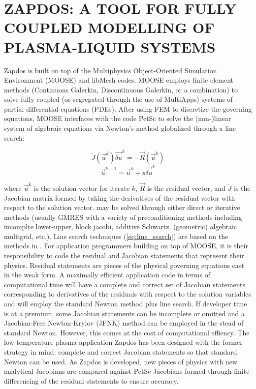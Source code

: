 \chapter{ZAPDOS: A TOOL FOR FULLY COUPLED MODELLING OF PLASMA-LIQUID SYSTEMS}

Zapdos is built on top of the Multiphysics Object-Oriented Simulation Environment (MOOSE) \cite{mooseSite} and libMesh \cite{libmeshSite} codes. MOOSE employs finite element methods (Continuous Galerkin, Discontinuous Galerkin, or a combination) to solve fully coupled (or segregated through the use of MultiApps) systems of partial differential equations (PDEs). After using FEM to discretize the governing equations, MOOSE interfaces with the code PetSc \cite{petscSite} to solve the (non-)linear system of algebraic equations via Newton's method globalized through a line search:

\begin{equation}
  \tilde{J}(\vec{u}^k)\vec{\delta u}^k = -\vec{R}(\vec{u}^k)
  \label{eq:Newton}
\end{equation}
\begin{equation}
  \vec{u}^{k+1} = \vec{u}^k + s\vec{\delta u}^k
  \label{eq:line_search}
\end{equation}

where $\vec{u}^k$ is the solution vector for iterate $k$, $\vec{R}$ is the residual vector, and $\tilde{J}$ is the Jacobian matrix formed by taking the derivatives of the residual vector with respect to the solution vector.\cite{knoll2004jacobian}  may be solved through either direct or iterative methods (usually GMRES with a variety of preconditioning methods including incomplte lower-upper, block jacobi, additive Schwartz, (geometric) algebraic multigrid, etc.). Line search techniques (\cref{eq:line_search}) are based on the methods in \cite{dennis1996numerical}. For application programmers building on top of MOOSE, it is their responsibility to code the residual and Jacobian statements that represent their physics. Residual statements are pieces of the physical governing equations cast in the weak form. A maximally efficient application code in terms of computational time will have a complete and correct set of Jacobian statements corresponding to derivatives of the residuals with respect to the solution variables and will employ the standard Newton method plus line search. If developer time is at a premium, some Jacobian statements can be incomplete or omitted and a Jacobian-Free Newton-Krylov (JFNK) method can be employed in the stead of standard Newton. However, this comes at the cost of computational effiency. The low-temperature plasma application Zapdos has been designed with the former strategy in mind: complete and correct Jacobian statements so that standard Newton can be used. As Zapdos is developed, new pieces of physics with new analytical Jacobians are compared against PetSc Jacobians formed through finite differencing of the residual statements to ensure accuracy.

